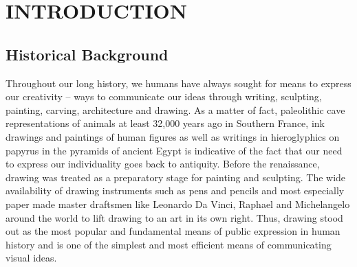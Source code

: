 \chapter{INTRODUCTION} %
\label{Introduction}

\section{Historical Background}
\hspace{30}Throughout our long history, we humans have always sought for means 
to express our creativity – ways to communicate our ideas through writing, 
sculpting, painting, carving, architecture and drawing. As a matter of fact,
paleolithic cave representations of animals at least 32,000 years ago in  
Southern France, ink drawings and paintings of human figures as well as writings 
in hieroglyphics on papyrus in the pyramids of ancient Egypt is
indicative of the fact that our need to express our individuality goes back to
antiquity. Before the renaissance, drawing was treated as a preparatory stage
for painting and sculpting. The wide availability of drawing instruments such as 
pens and pencils and most especially paper made master draftsmen like
Leonardo Da Vinci, Raphael and Michelangelo around the world to lift drawing
to an art in its own right. Thus, drawing stood out as the most popular and
fundamental means of public expression in human history and is one of the
simplest and most efficient means of communicating visual ideas. \cite{1}\\

